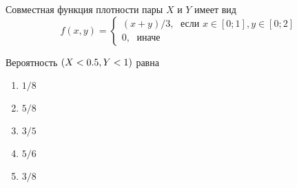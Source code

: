 \documentclass[t]{beamer}
\let\P\relax
\DeclareMathOperator{\P}{\mathbb{P}}
\begin{document}
 \begin{frame} \label{22} 
\begin{block}{22} 

Совместная функция плотности пары $X$ и $Y$ имеет вид
\[
f(x,y)=\begin{cases}
(x+y)/3, \; \text{ если } x\in[0;1], y\in [0;2] \\
0, \; \text{ иначе}
\end{cases}
\]

\vspace{0.5cm} 
 
 Вероятность $\P(X<0.5, Y<1)$ равна
 


 \end{block} 
\begin{enumerate} 
\item[] \hyperlink{22-Yes}{\beamergotobutton{} $1/8$}
\item[] \hyperlink{22-No}{\beamergotobutton{} $5/8$}
\item[] \hyperlink{22-No}{\beamergotobutton{} $3/5$}
\item[] \hyperlink{22-No}{\beamergotobutton{} $5/6$}
\item[] \hyperlink{22-No}{\beamergotobutton{} $3/8$
}
\end{enumerate} 
\end{frame} 
\end{document}
